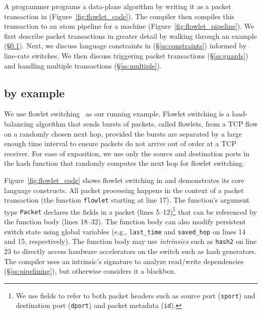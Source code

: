 A programmer programs a data-plane algorithm by writing it as
a packet transaction in \pktlanguage (Figure~\ref{fig:flowlet_code}).  The
\pktlanguage compiler then compiles this transaction to an atom pipeline for a
\absmachine machine (Figure~\ref{fig:flowlet_pipeline}). We first describe
packet transactions in greater detail by walking through an example
(\S\ref{ss:flowlet}). Next, we discuss language constraints in \pktlanguage
(\S\ref{ss:constraints}) informed by line-rate switches.  We then discuss
triggering packet transactions (\S\ref{ss:guards}) and handling multiple
transactions (\S\ref{ss:multiple}).

\subsection{\pktlanguage by example}
\label{ss:flowlet}

We use flowlet switching~\cite{flowlets} as our running example. Flowlet
switching is a load-balancing algorithm that sends bursts of packets, called
flowlets, from a TCP flow on a randomly chosen next hop, provided the bursts
are separated by a large enough time interval to ensure packets do not arrive
out of order at a TCP receiver. For ease of exposition, we use only the source
and destination ports in the hash function that randomly computes the next hop
for flowlet switching.

Figure~\ref{fig:flowlet_code} shows flowlet switching in \pktlanguage and
demonstrates its core language constructs. All packet processing happens in the
context of a packet transaction (the function \texttt{flowlet} starting at line
17). The function's argument type {\tt Packet} declares the fields in a packet
(lines 5--12)\footnote{We use fields to refer to both packet headers such as
source port ({\tt sport}) and destination port ({\tt dport}) and packet
metadata ({\tt id}).} that can be referenced by the function body (lines
18--32).  The function body can also modify persistent switch state using
global variables (e.g., \texttt{last\_time} and \texttt{saved\_hop} on lines 14
and 15, respectively). The function body may use \textit{intrinsics} such as
\texttt{hash2} on line 23 to directly access hardware accelerators on the
switch such as hash generators.  The \pktlanguage compiler uses an intrinsic's
signature to analyze read/write dependencies (\S\ref{ss:pipelining}), but otherwise considers it a blackbox.

